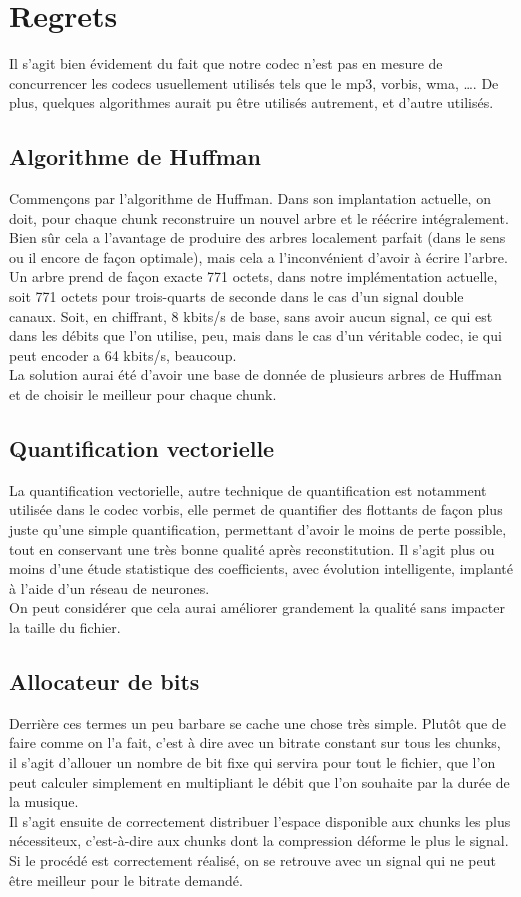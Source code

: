 \documentclass[a4paper,12pt]{report}
\begin{document}
\chapter{Regrets}
Il s'agit bien évidement du fait que notre codec n'est pas en mesure de
concurrencer les codecs usuellement utilisés tels que le mp3, vorbis, wma, \ldots.
De plus, quelques algorithmes aurait pu être utilisés autrement, et d'autre
utilisés.\\
\section{Algorithme de Huffman}
Commençons par l'algorithme de Huffman. Dans son implantation actuelle, on doit,
pour chaque chunk reconstruire un nouvel arbre et le réécrire intégralement.
Bien sûr cela a l'avantage de produire des arbres localement parfait (dans le
sens ou il encore de façon optimale), mais cela a l'inconvénient d'avoir à
écrire l'arbre. Un arbre prend de façon exacte 771 octets, dans notre
implémentation actuelle, soit 771 octets pour trois-quarts de seconde dans le
cas d'un signal double canaux. Soit, en chiffrant, 8 kbits/s de base, sans avoir
aucun signal, ce qui est dans les débits que l'on utilise, peu, mais dans le cas
d'un véritable codec, ie qui peut encoder a 64 kbits/s, beaucoup.\\
La solution aurai été d'avoir une base de donnée de plusieurs arbres de Huffman
et de choisir le meilleur pour chaque chunk.
\section{Quantification vectorielle}
La quantification vectorielle, autre technique de quantification est notamment
utilisée dans le codec vorbis, elle permet de quantifier des flottants de façon
plus juste qu'une simple quantification, permettant d'avoir le moins de perte
possible, tout en conservant une très bonne qualité après reconstitution. Il
s'agit plus ou moins d'une étude statistique des coefficients, avec évolution
intelligente, implanté à l'aide d'un réseau de neurones.\\
On peut considérer que cela aurai améliorer grandement la qualité sans impacter
la taille du fichier.
\section{Allocateur de bits}
Derrière ces termes un peu barbare se cache une chose très simple. Plutôt que de
faire comme on l'a fait, c'est à dire avec un bitrate constant sur tous les
chunks, il s'agit d'allouer un nombre de bit fixe qui servira pour tout le
fichier, que l'on peut calculer simplement en multipliant le débit que l'on
souhaite par la durée de la musique.\\
Il s'agit ensuite de correctement distribuer l'espace disponible aux chunks les
plus nécessiteux, c'est-à-dire aux chunks dont la compression déforme le plus le
signal. Si le procédé est correctement réalisé, on se retrouve avec un signal
qui ne peut être meilleur pour le bitrate demandé.
\end{document}
